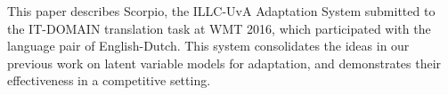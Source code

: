 This paper describes Scorpio, the ILLC-UvA Adaptation System submitted to the IT-DOMAIN translation task at WMT 2016, which participated with the language pair of English-Dutch. This system consolidates the ideas in our previous work on latent variable models for adaptation, and demonstrates their effectiveness in a competitive setting.
